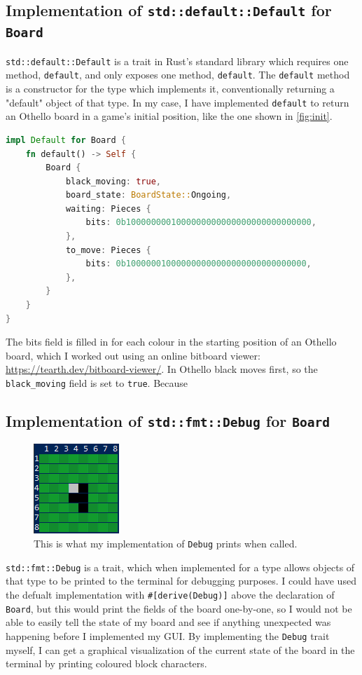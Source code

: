 \documentclass[12pt, a4paper]{report}
\begin{document}
\subsection{Implementation of \texttt{std::default::Default} for \texttt{Board}}
\texttt{std::default::Default} is a trait in Rust's standard library which requires one method, \texttt{default}, and only exposes one method, \texttt{default}. The \texttt{default} method is a constructor for the type which 
implements it, conventionally returning a "default" object of that type. In my case, I have implemented \texttt{default} to return an Othello board in a game's initial position, like the one shown in \ref{fig:init}.

\begin{lstlisting}[language=Rust]
impl Default for Board {
    fn default() -> Self {
        Board {
            black_moving: true,
            board_state: BoardState::Ongoing,
            waiting: Pieces {
                bits: 0b1000000001000000000000000000000000000,
            },
            to_move: Pieces {
                bits: 0b100000010000000000000000000000000000,
            },
        }
    }
}
\end{lstlisting}

The bits field is filled in for each colour in the starting position of an Othello board, which I worked out using an online bitboard viewer: \url{https://tearth.dev/bitboard-viewer/}.
In Othello black moves first, so the \texttt{black\_moving} field is set to \texttt{true}. Because 

\subsection{Implementation of \texttt{std::fmt::Debug} for \texttt{Board}}

\begin{figure}
	\centering
	\includegraphics{debug_impl}
	\caption{This is what my implementation of \texttt{Debug} prints when called.}
\end{figure}

\texttt{std::fmt::Debug} is a trait, which when implemented for a type allows objects of that type to be printed to the terminal for debugging purposes. I could have used the defualt implementation with 
\texttt{\#[derive(Debug)]} above the declaration of \texttt{Board}, but this would print the fields of the board one-by-one, so I would not be able to easily tell the state of my board and see if anything unexpected
was happening before I implemented my GUI. By implementing the \texttt{Debug} trait myself, I can get a graphical visualization of the current state of the board in the terminal by printing coloured block characters.
\end{document}
